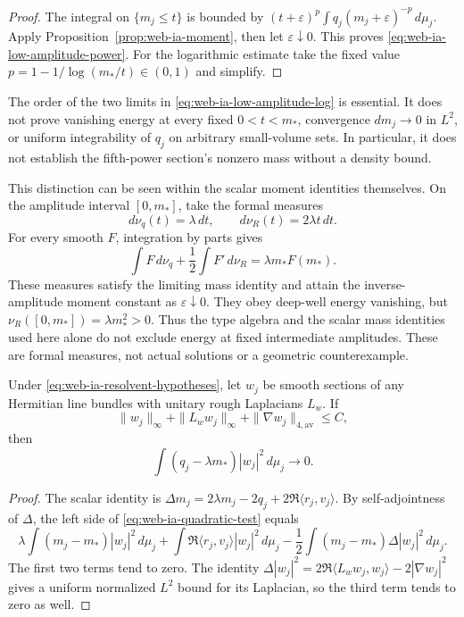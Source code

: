\begin{proof}
The integral on \(\{m_j\le t\}\) is bounded by
\((t+\varepsilon)^p\int q_j(m_j+\varepsilon)^{-p}\,d\mu_j\).
Apply Proposition~\ref{prop:web-ia-moment}, then let
\(\varepsilon\downarrow0\).  This proves
\eqref{eq:web-ia-low-amplitude-power}.  For the logarithmic estimate take
the fixed value \(p=1-1/\log(m_*/t)\in(0,1)\) and simplify.
\end{proof}

The order of the two limits in \eqref{eq:web-ia-low-amplitude-log} is
essential.  It does not prove vanishing energy at every fixed
\(0<t<m_*\), convergence \(dm_j\to0\) in \(L^2\), or uniform
integrability of \(q_j\) on arbitrary small-volume sets.  In particular,
it does not establish the fifth-power section's nonzero mass without a
density bound.

This distinction can be seen within the scalar moment identities themselves.
On the amplitude interval \([0,m_*]\), take the formal measures
\[
 d\nu_q(t)=\lambda\,dt,\qquad d\nu_R(t)=2\lambda t\,dt.
\]
For every smooth \(F\), integration by parts gives
\[
 \int F\,d\nu_q+\frac12\int F'\,d\nu_R
       =\lambda m_*F(m_*).
\]
These measures satisfy the limiting mass identity and attain the
inverse-amplitude moment constant as \(\varepsilon\downarrow0\).
They obey deep-well energy vanishing, but
\(\nu_R([0,m_*])=\lambda m_*^2>0\).  Thus the type algebra and the
scalar mass identities used here alone do not exclude energy at fixed
intermediate amplitudes.  These are formal measures, not actual solutions
or a geometric counterexample.

\begin{lemma}
\label{lem:web-ia-quadratic-test}
Under \eqref{eq:web-ia-resolvent-hypotheses}, let \(w_j\) be smooth
sections of any Hermitian line bundles with unitary rough Laplacians
\(L_w\).  If
\[
 \|w_j\|_\infty+\|L_ww_j\|_\infty
       +\|\nabla w_j\|_{4,\mathrm{av}}\le C,
\]
then
\begin{equation}
 \int(q_j-\lambda m_*)|w_j|^2\,d\mu_j\longrightarrow0.
 \label{eq:web-ia-quadratic-test}
\end{equation}
\end{lemma}

\begin{proof}
The scalar identity is
\(\Delta m_j=2\lambda m_j-2q_j+2\Re\langle r_j,v_j\rangle\).
By self-adjointness of \(\Delta\), the left side of
\eqref{eq:web-ia-quadratic-test} equals
\[
 \lambda\int(m_j-m_*)|w_j|^2\,d\mu_j
 +\int\Re\langle r_j,v_j\rangle|w_j|^2\,d\mu_j
 -\frac12\int(m_j-m_*)\Delta|w_j|^2\,d\mu_j.
\]
The first two terms tend to zero.  The identity
\(\Delta|w_j|^2=2\Re\langle L_ww_j,w_j\rangle
-2|\nabla w_j|^2\) gives a uniform normalized \(L^2\) bound for its
Laplacian, so the third term tends to zero as well.
\end{proof}

